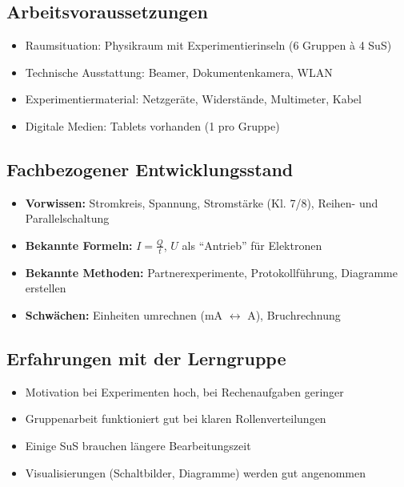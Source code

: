 \documentclass[11pt,a4paper]{article}
\begin{document}
\subsection{Arbeitsvoraussetzungen}
\begin{itemize}
    \item Raumsituation: Physikraum mit Experimentierinseln (6 Gruppen à 4 SuS)
    \item Technische Ausstattung: Beamer, Dokumentenkamera, WLAN
    \item Experimentiermaterial: Netzgeräte, Widerstände, Multimeter, Kabel
    \item Digitale Medien: Tablets vorhanden (1 pro Gruppe)
\end{itemize}

\subsection{Fachbezogener Entwicklungsstand}
\begin{itemize}
    \item \textbf{Vorwissen:} Stromkreis, Spannung, Stromstärke (Kl. 7/8), Reihen- und Parallelschaltung
    \item \textbf{Bekannte Formeln:} $I = \frac{Q}{t}$, $U$ als ``Antrieb'' für Elektronen
    \item \textbf{Bekannte Methoden:} Partnerexperimente, Protokollführung, Diagramme erstellen
    \item \textbf{Schwächen:} Einheiten umrechnen (mA $\leftrightarrow$ A), Bruchrechnung
\end{itemize}

\subsection{Erfahrungen mit der Lerngruppe}
\begin{itemize}
    \item Motivation bei Experimenten hoch, bei Rechenaufgaben geringer
    \item Gruppenarbeit funktioniert gut bei klaren Rollenverteilungen
    \item Einige SuS brauchen längere Bearbeitungszeit
    \item Visualisierungen (Schaltbilder, Diagramme) werden gut angenommen
\end{itemize}

\end{document}
